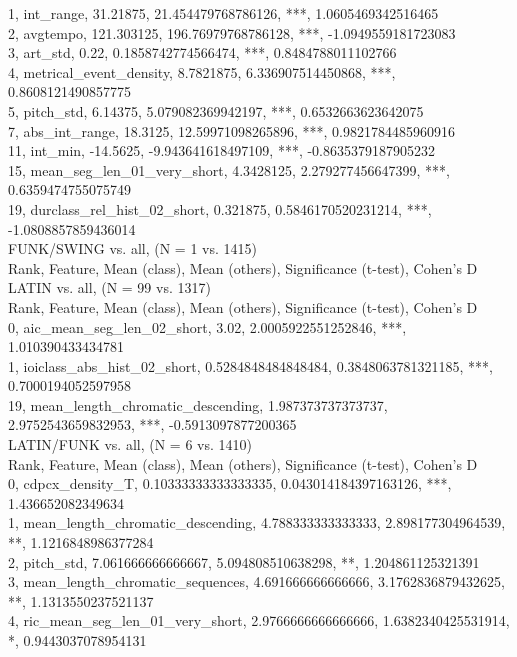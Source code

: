 1, int_range, 31.21875, 21.454479768786126, ***, 1.0605469342516465\\
2, avgtempo, 121.303125, 196.76979768786128, ***, -1.0949559181723083\\
3, art_std, 0.22, 0.1858742774566474, ***, 0.8484788011102766\\
4, metrical_event_density, 8.7821875, 6.336907514450868, ***, 0.8608121490857775\\
5, pitch_std, 6.14375, 5.079082369942197, ***, 0.6532663623642075\\
7, abs_int_range, 18.3125, 12.59971098265896, ***, 0.9821784485960916\\
11, int_min, -14.5625, -9.943641618497109, ***, -0.8635379187905232\\
15, mean_seg_len_01_very_short, 4.3428125, 2.279277456647399, ***, 0.6359474755075749\\
19, durclass_rel_hist_02_short, 0.321875, 0.5846170520231214, ***, -1.0808857859436014\\
FUNK/SWING vs. all, (N = 1 vs. 1415)\\
Rank, Feature, Mean (class), Mean (others), Significance (t-test), Cohen's D\\
LATIN vs. all, (N = 99 vs. 1317)\\
Rank, Feature, Mean (class), Mean (others), Significance (t-test), Cohen's D\\
0, aic_mean_seg_len_02_short, 3.02, 2.0005922551252846, ***, 1.010390433434781\\
1, ioiclass_abs_hist_02_short, 0.5284848484848484, 0.3848063781321185, ***, 0.7000194052597958\\
19, mean_length_chromatic_descending, 1.987373737373737, 2.9752543659832953, ***, -0.5913097877200365\\
LATIN/FUNK vs. all, (N = 6 vs. 1410)\\
Rank, Feature, Mean (class), Mean (others), Significance (t-test), Cohen's D\\
0, cdpcx_density_T, 0.10333333333333335, 0.043014184397163126, ***, 1.436652082349634\\
1, mean_length_chromatic_descending, 4.788333333333333, 2.898177304964539, **, 1.1216848986377284\\
2, pitch_std, 7.061666666666667, 5.094808510638298, **, 1.204861125321391\\
3, mean_length_chromatic_sequences, 4.691666666666666, 3.1762836879432625, **, 1.1313550237521137\\
4, ric_mean_seg_len_01_very_short, 2.9766666666666666, 1.6382340425531914, *, 0.9443037078954131\\
